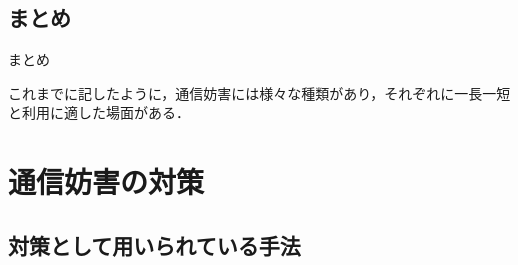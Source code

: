 \documentclass[11pt, aspectratio=169]{beamer}
\begin{document}
\subsection{まとめ}

\begin{frame}{まとめ}
  \begin{block}{}
    これまでに記したように，通信妨害には様々な種類があり，それぞれに一長一短と利用に適した場面がある．
  \end{block}
\end{frame}

\section{通信妨害の対策}

\subsection{対策として用いられている手法}
\end{document}
